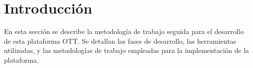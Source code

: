 \section{Introducción}
\label{sec:metodologia_introduccion}

En esta sección se describe la metodología de trabajo seguida para el desarrollo de esta plataforma OTT.
Se detallan las fases de desarrollo, las herramientas utilizadas, y las metodologías de trabajo empleadas
para la implementación de la plataforma. 



